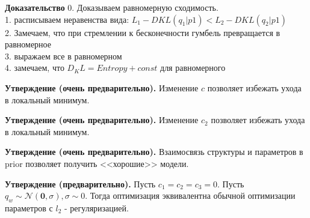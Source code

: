 \textbf{Доказательство}
0. Доказываем равномерную сходимость.\\
1. расписываем неравенства вида: $L_1 - DKL(q_1|p1) <L_2 - DKL(q_2|p1)$\\
2. Замечаем, что при стремлении к бесконечности гумбель превращается в равномерное\\
3. выражаем все в равномерном\\
4. замечаем, что $D_KL = Entropy + const$ для равномерного



\textbf{Утверждение (очень предварительно).} Изменение $c$ позволяет избежать ухода в локальный минимум. 

\textbf{Утверждение (очень предварительно).} Изменение $c_2$ позволяет избежать ухода в локальный минимум.

\textbf{Утверждение (очень предварительно).} Взаимосвязь структуры и параметров в prior позволяет получить <<хорошие>> модели.

\textbf{Утверждение (предварительно).} Пусть $c_1 = c_2 = c_3 = 0$. Пусть $q_w \sim \mathcal{N}(\mathbf{0}, \sigma), \sigma \sim 0$. 
Тогда оптимизация эквивалентна обычной оптимизации параметров с $l_2$ - регуляризацией.


